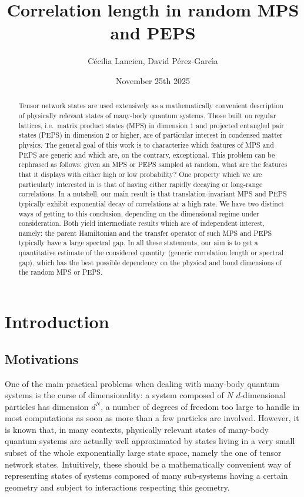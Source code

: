 \documentclass{amsart}
\title{Correlation length in random MPS and PEPS}
\author{C\'{e}cilia Lancien, David P\'{e}rez-Garc\'{\i}a}
\date{November 25th 2025}
\begin{document}
\begin{abstract}
    Tensor network states are used extensively as a mathematically convenient description of physically relevant states of many-body quantum systems. Those built on regular lattices, i.e.~matrix product states (MPS) in dimension $1$ and projected entangled pair states (PEPS) in dimension $2$ or higher, are of particular interest in condensed matter physics. The general goal of this work is to characterize which features of MPS and PEPS are generic and which are, on the contrary, exceptional. This problem can be rephrased as follows: given an MPS or PEPS sampled at random, what are the features that it displays with either high or low probability? One property which we are particularly interested in is that of having either rapidly decaying or long-range correlations. In a nutshell, our main result is that translation-invariant MPS and PEPS typically exhibit exponential decay of correlations at a high rate. We have two distinct ways of getting to this conclusion, depending on the dimensional regime under consideration. Both yield intermediate results which are of independent interest, namely: the parent Hamiltonian and the transfer operator of such MPS and PEPS typically have a large spectral gap. In all these statements, our aim is to get a quantitative estimate of the considered quantity (generic correlation length or spectral gap), which has the best possible dependency on the physical and bond dimensions of the random MPS or PEPS.
\end{abstract}

\maketitle

\tableofcontents

\newpage

\section{Introduction}

\subsection{Motivations} \hfill\par\smallskip

One of the main practical problems when dealing with many-body quantum systems is the curse of dimensionality: a system composed of $N$ $d$-dimensional particles has dimension $d^N$, a number of degrees of freedom too large to handle in most computations as soon as more than a few particles are involved. However, it is known that, in many contexts, physically relevant states of many-body quantum systems are actually well approximated by states living in a very small subset of the whole exponentially large state space, namely the one of tensor network states. Intuitively, these should be a mathematically convenient way of representing states of systems composed of many sub-systems having a certain geometry and subject to interactions respecting this geometry.
\end{document}
